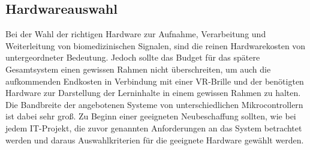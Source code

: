 \subsection{Hardwareauswahl} \label{hardwareauswahl-1}

Bei der Wahl der richtigen Hardware zur Aufnahme, Verarbeitung und Weiterleitung von
biomedizinischen Signalen, sind die reinen Hardwarekosten von untergeordneter Bedeutung.
Jedoch sollte das Budget für das spätere Gesamtsystem einen gewissen Rahmen nicht überschreiten,
um auch die aufkommenden Endkosten in Verbindung mit einer VR-Brille und der
benötigten Hardware zur Darstellung der Lerninhalte in einem gewissen Rahmen zu halten.
Die Bandbreite der angebotenen Systeme von unterschiedlichen Mikrocontrollern ist dabei
sehr groß. Zu Beginn einer geeigneten Neubeschaffung sollten, wie bei jedem IT-Projekt, die
zuvor genannten Anforderungen an das System betrachtet werden und daraus Auswahlkriterien
für die geeignete Hardware gewählt werden.





